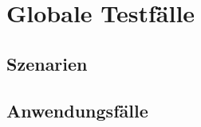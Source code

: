 \section{Globale Testfälle}


\subsection{Szenarien}

\subsection{Anwendungsfälle}

\begin{center}
\resizebox{\textwidth}{!} {
	
}
\end{center}